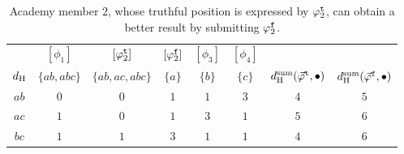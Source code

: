 \begin{table}\centering
\begin{tabular}{cccccccc}
	\toprule
					  &
	$[\phi_1]$        &
	$[{\varphi}^{\mathtt{t}}_2]$        &
	$[{\varphi}^{\mathtt{f}}_2]$        &
	$[\phi_3]$        &
	$[\phi_4]$        &
					  &
					  \\

	$d_{\operatorname{H}}$    & 
	$\{ab,abc\}$      & 
	$\{ab, ac, abc\}$ &
	$\{a\}$           & 
	$\{b\}$           & 
	$\{c\}$           &  
	$d_{{\operatorname{H}}}^{{\operatorname{sum}}}({{\vec{\varphi}}}^{\mathtt{t}},\bullet)$ & 
	$d_{{\operatorname{H}}}^{{\operatorname{sum}}}({{\vec{\varphi}}}^{\mathtt{f}},\bullet)$ \\\midrule

	$ab$              &
	$0$               &
	$0$               & 
	$1$               & 
	$1$               & 
	$3$       & 
	$4$       & 
	$5$               \\

	$ac$              &
	$1$               &
	$0$               & 
	$1$               & 
	$3$               & 
	$1$       & 
	$5$       & 
	$6$               \\

	$bc$              &
	$1$               &
	$1$               & 
	$3$               & 
	$1$               & 
	$1$       & 
	$4$       & 
	$6$               \\
	\bottomrule
	\end{tabular}
	\caption{
		Academy member $2$, whose truthful
		position is expressed by ${\varphi}^{\mathtt{t}}_{2}$,
		can obtain a better result by submitting 
		${\varphi}^{\mathtt{f}}_{2}$.
	}
	\label{tab:5-manip-motivation}
\end{table}

